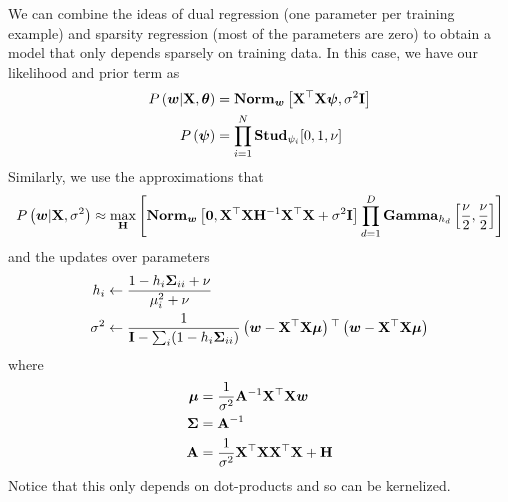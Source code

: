 We can combine the ideas of dual regression (one parameter per training example) and sparsity regression (most of the parameters are zero) to obtain a model that only depends sparsely on training data. In this case, we have our likelihood and prior term as
\begin{align*}
	P\left(\boldsymbol{w}|\mathbf{X},\boldsymbol{\theta}\right)&=\mathbf{Norm}_{\boldsymbol{w}}\left[\mathbf{X}^\top\mathbf{X}\boldsymbol{\psi},\sigma^2\mathbf{I}\right] \\
	P\left(\boldsymbol{\psi}\right)&=\prod_{i=1}^N\mathbf{Stud}_{\psi_i}[0,1,\nu]
\end{align*}
Similarly, we use the approximations that
\begin{align*}
	P\left(\boldsymbol{w}|\mathbf{X},\sigma^2\right)\approx\max_{\mathbf{H}}\left[\mathbf{Norm}_{\boldsymbol{w}}\left[\boldsymbol{0},\mathbf{X}^\top\mathbf{X}\mathbf{H}^{-1}\mathbf{X}^\top\mathbf{X}+\sigma^2\mathbf{I}\right]\prod_{d=1}^D\mathbf{Gamma}_{h_d}\left[\frac{\nu}{2},\frac{\nu}{2}\right]\right]
\end{align*}
and the updates over parameters
\begin{align*}
	h_i&\gets\frac{1-h_i\mathbf{\Sigma}_{ii}+\nu}{\mu_i^2+\nu} \\
	\sigma^2&\gets\frac{1}{\mathbf{I}-\sum_i(1-h_i\mathbf{\Sigma}_{ii})}\left(\boldsymbol{w}-\mathbf{X}^\top\mathbf{X}\boldsymbol{\mu}\right){}^\top\left(\boldsymbol{w}-\mathbf{X}^\top\mathbf{X}\boldsymbol{\mu}\right)
\end{align*}
where
\begin{align*}
	\boldsymbol{\mu}&=\frac{1}{\sigma^2}\mathbf{A}^{-1}\mathbf{X}^\top\mathbf{X}\boldsymbol{w} \\
	\mathbf{\Sigma}&=\mathbf{A}^{-1} \\
	\mathbf{A}&=\frac{1}{\sigma^2}\mathbf{X}^\top\mathbf{X}\mathbf{X}^\top\mathbf{X}+\mathbf{H}
\end{align*}
Notice that this only depends on dot-products and so can be kernelized.